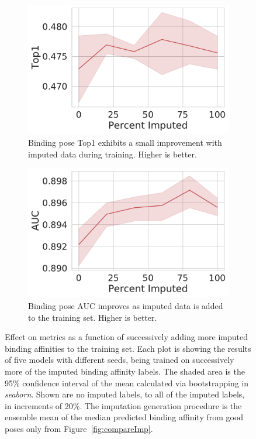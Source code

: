 \documentclass[journal=jcim,manuscript=article]{achemso}
\begin{document}
\begin{figure}[tbph]
    \begin{subfigure}[t]{0.48\textwidth}
        \centering
        \includegraphics[width=\linewidth]{figures/MedGOEns_addingImpTop1.pdf}
        \caption{Binding pose Top1 exhibits a small improvement with imputed data during training. Higher is better.}
    \end{subfigure}
    \hfill
    \begin{subfigure}[t]{0.48\textwidth}
        \centering
        \includegraphics[width=\linewidth]{figures/MedGOEns_addingImpAUC.pdf}
        \caption{Binding pose AUC improves as imputed data is added to the training set. Higher is better.}
    \end{subfigure}
    \caption{Effect on metrics as a function of successively adding more imputed binding affinities to the training set. Each plot is showing the results of five models with different seeds, being trained on successively more of the imputed binding affinity labels. The shaded area is the 95\% confidence interval of the mean calculated via bootstrapping in \textit{seaborn}. Shown are no imputed labels, to all of the imputed labels, in increments of 20\%. The imputation generation procedure is the ensemble mean of the median predicted binding affinity from good poses only from Figure~\ref{fig:compareImp}.}
    \label{fig:medGOEnsAdding}
\end{figure}
\end{document}
